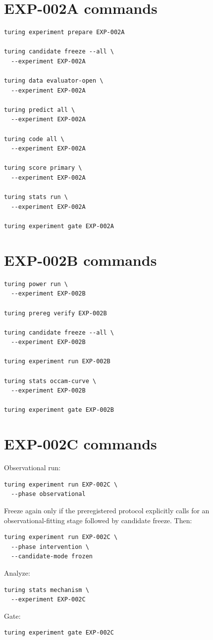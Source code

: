 \documentclass[11pt]{article}
\begin{document}
\section{EXP-002A commands}

\begin{verbatim}
turing experiment prepare EXP-002A

turing candidate freeze --all \
  --experiment EXP-002A

turing data evaluator-open \
  --experiment EXP-002A

turing predict all \
  --experiment EXP-002A

turing code all \
  --experiment EXP-002A

turing score primary \
  --experiment EXP-002A

turing stats run \
  --experiment EXP-002A

turing experiment gate EXP-002A
\end{verbatim}

\section{EXP-002B commands}

\begin{verbatim}
turing power run \
  --experiment EXP-002B

turing prereg verify EXP-002B

turing candidate freeze --all \
  --experiment EXP-002B

turing experiment run EXP-002B

turing stats occam-curve \
  --experiment EXP-002B

turing experiment gate EXP-002B
\end{verbatim}

\section{EXP-002C commands}

Observational run:
\begin{verbatim}
turing experiment run EXP-002C \
  --phase observational
\end{verbatim}
Freeze again only if the preregistered protocol explicitly calls for an observational-fitting stage followed by candidate freeze. Then:
\begin{verbatim}
turing experiment run EXP-002C \
  --phase intervention \
  --candidate-mode frozen
\end{verbatim}
Analyze:
\begin{verbatim}
turing stats mechanism \
  --experiment EXP-002C
\end{verbatim}
Gate:
\begin{verbatim}
turing experiment gate EXP-002C
\end{verbatim}
\end{document}
